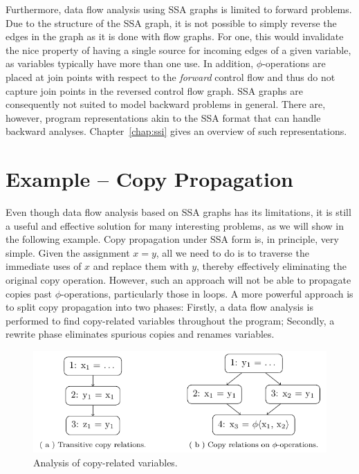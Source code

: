 Furthermore, data flow analysis using SSA graphs is limited to forward problems.
Due to the structure of the SSA graph, it is not possible to simply reverse the
edges in the graph as it is done with flow graphs. For one, this would
invalidate the nice property of having a single source for incoming edges of a
given variable, as variables typically have more than one use. In addition,
$\phi$-operations are placed at join points with respect to the \emph{forward}
control flow and thus do not capture join points in the reversed control flow
graph.
SSA graphs are consequently not suited to model backward problems in general.
There are, however, program representations akin to the SSA format that can
handle backward analyses.
Chapter~\ref{chap:ssi} gives an overview of such representations.

\section{Example -- Copy Propagation}
\label{novillo:sec:example}

Even though data flow analysis based on SSA graphs has its limitations, it is
still a useful and effective solution for many interesting problems, as we will
show in the following example.
Copy propagation under SSA form is, in principle, very simple.  Given the
assignment $x = y$, all we need to do is to traverse the immediate
uses of $x$ and replace them with $y$, thereby effectively eliminating the
original copy operation. However, such an approach will not be able to propagate
copies past \linebreak $\phi$-operations, particularly those in loops. A more powerful
approach is to split copy propagation into two phases: Firstly, a data flow
analysis is performed to find copy-related variables throughout the program;
Secondly, a rewrite phase eliminates spurious copies and renames variables.

\begin{figure}[t!]
  \begin{center}
    \includegraphics{copy_propagation}
    \subfloat{\label{novillo:fig:copy_propagation:a}}
    \subfloat{\label{novillo:fig:copy_propagation:b}}
  \end{center}
  \vspace{-1em}
  \caption{Analysis of copy-related variables.}
  \label{novillo:fig:copy_propagation}
\end{figure}

